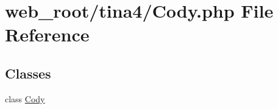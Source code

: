 \hypertarget{Cody_8php}{}\section{web\+\_\+root/tina4/\+Cody.php File Reference}
\label{Cody_8php}
\subsection*{Classes}
\begin{DoxyCompactItemize}
\item 
class \hyperlink{classCody}{Cody}
\end{DoxyCompactItemize}
